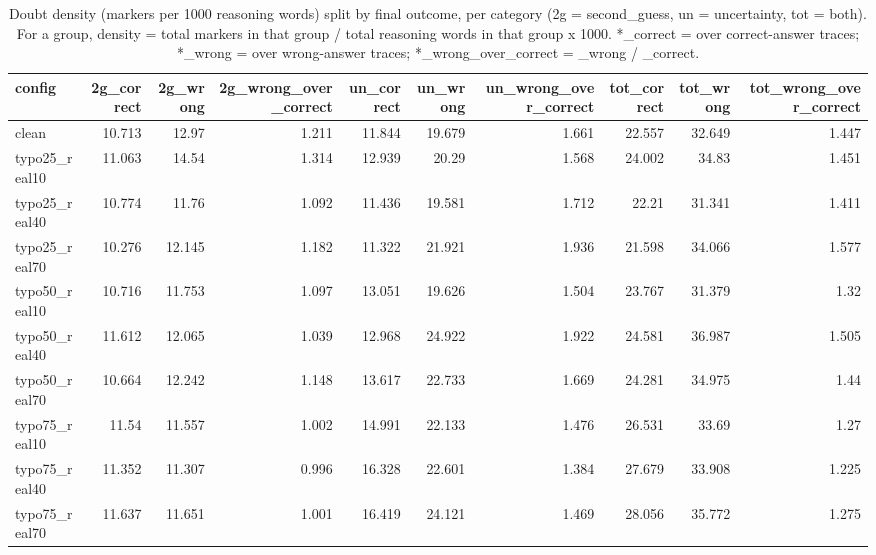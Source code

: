 \documentclass[11pt]{article}
\begin{document}
\begin{table}[H]
\centering
\caption{Doubt density (markers per 1000 reasoning words) split by final outcome, per category (2g = second\_guess, un = uncertainty, tot = both). For a group, density = total markers in that group / total reasoning words in that group x 1000. *\_correct = over correct-answer traces; *\_wrong = over wrong-answer traces; *\_wrong\_over\_correct = \_wrong / \_correct.}
\small
\begin{adjustbox}{max width=\textwidth}
\begin{tabular}{lrrrrrrrrr}
\toprule
\textbf{config} & \textbf{2g\_correct} & \textbf{2g\_wrong} & \textbf{2g\_wrong\_over\_correct} & \textbf{un\_correct} & \textbf{un\_wrong} & \textbf{un\_wrong\_over\_correct} & \textbf{tot\_correct} & \textbf{tot\_wrong} & \textbf{tot\_wrong\_over\_correct} \\
\midrule
clean & 10.713 & 12.97 & 1.211 & 11.844 & 19.679 & 1.661 & 22.557 & 32.649 & 1.447 \\
typo25\_real10 & 11.063 & 14.54 & 1.314 & 12.939 & 20.29 & 1.568 & 24.002 & 34.83 & 1.451 \\
typo25\_real40 & 10.774 & 11.76 & 1.092 & 11.436 & 19.581 & 1.712 & 22.21 & 31.341 & 1.411 \\
typo25\_real70 & 10.276 & 12.145 & 1.182 & 11.322 & 21.921 & 1.936 & 21.598 & 34.066 & 1.577 \\
typo50\_real10 & 10.716 & 11.753 & 1.097 & 13.051 & 19.626 & 1.504 & 23.767 & 31.379 & 1.32 \\
typo50\_real40 & 11.612 & 12.065 & 1.039 & 12.968 & 24.922 & 1.922 & 24.581 & 36.987 & 1.505 \\
typo50\_real70 & 10.664 & 12.242 & 1.148 & 13.617 & 22.733 & 1.669 & 24.281 & 34.975 & 1.44 \\
typo75\_real10 & 11.54 & 11.557 & 1.002 & 14.991 & 22.133 & 1.476 & 26.531 & 33.69 & 1.27 \\
typo75\_real40 & 11.352 & 11.307 & 0.996 & 16.328 & 22.601 & 1.384 & 27.679 & 33.908 & 1.225 \\
typo75\_real70 & 11.637 & 11.651 & 1.001 & 16.419 & 24.121 & 1.469 & 28.056 & 35.772 & 1.275 \\
\bottomrule
\end{tabular}
\end{adjustbox}
\end{table}
\end{document}
